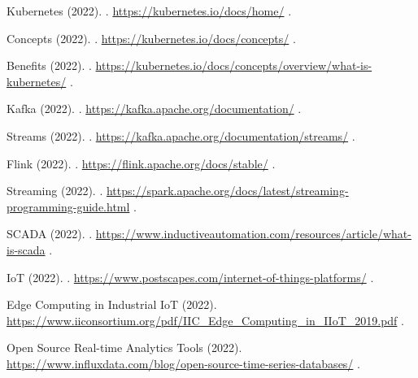\begin{thebibliography}{99}
    Kubernetes (2022).
    .
    \newblock \url{https://kubernetes.io/docs/home/}
    \newblock [Accessed: 01/01/2024].

    Concepts (2022).
    .
    \newblock \url{https://kubernetes.io/docs/concepts/}
    \newblock [Accessed: 01/01/2024].

    Benefits (2022).
    .
    \newblock \url{https://kubernetes.io/docs/concepts/overview/what-is-kubernetes/}
    \newblock [Accessed: 01/01/2024].

    Kafka (2022).
    .
    \newblock \url{https://kafka.apache.org/documentation/}
    \newblock [Accessed: 01/01/2024].

    Streams (2022).
    .
    \newblock \url{https://kafka.apache.org/documentation/streams/}
    \newblock [Accessed: 01/01/2024].

    Flink (2022).
    .
    \newblock \url{https://flink.apache.org/docs/stable/}
    \newblock [Accessed: 01/01/2024].

    Streaming (2022).
    .
    \newblock \url{https://spark.apache.org/docs/latest/streaming-programming-guide.html}
    \newblock [Accessed: 01/01/2024].

    SCADA (2022).
    .
    \newblock \url{https://www.inductiveautomation.com/resources/article/what-is-scada}
    \newblock [Accessed: 01/01/2024].

    IoT (2022).
    .
    \newblock \url{https://www.postscapes.com/internet-of-things-platforms/}
    \newblock [Accessed: 01/01/2024].

    Edge Computing in Industrial IoT (2022).
    \newblock \url{https://www.iiconsortium.org/pdf/IIC_Edge_Computing_in_IIoT_2019.pdf}
    \newblock [Accessed: 01/01/2024].

    Open Source Real-time Analytics Tools (2022).
    \newblock \url{https://www.influxdata.com/blog/open-source-time-series-databases/}
    \newblock [Accessed: 01/01/2024].


\end{thebibliography}

